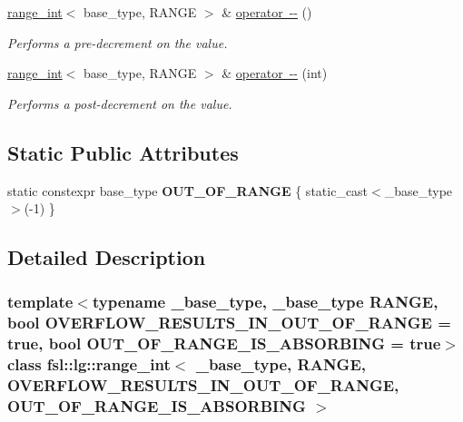 \begin{DoxyCompactItemize}
\mbox{\label{classfsl_1_1lg_1_1range__int_a06da23d144b8af8060cc6797b2fa03a1}} 
\mbox{\hyperlink{classfsl_1_1lg_1_1range__int}{range\+\_\+int}}$<$ base\+\_\+type, R\+A\+N\+GE $>$ \& \mbox{\hyperlink{classfsl_1_1lg_1_1range__int_a06da23d144b8af8060cc6797b2fa03a1}{operator -\/-\/}} ()
\begin{DoxyCompactList}\small\item\em Performs a pre-\/decrement on the value. \end{DoxyCompactList}\item 
\mbox{\label{classfsl_1_1lg_1_1range__int_ae1b50c47435f0b925c9737a3fed4fab8}} 
\mbox{\hyperlink{classfsl_1_1lg_1_1range__int}{range\+\_\+int}}$<$ base\+\_\+type, R\+A\+N\+GE $>$ \& \mbox{\hyperlink{classfsl_1_1lg_1_1range__int_ae1b50c47435f0b925c9737a3fed4fab8}{operator -\/-\/}} (int)
\begin{DoxyCompactList}\small\item\em Performs a post-\/decrement on the value. \end{DoxyCompactList}\end{DoxyCompactItemize}
\subsection*{Static Public Attributes}
\begin{DoxyCompactItemize}
\item 
\mbox{\label{classfsl_1_1lg_1_1range__int_ad2c724f2b6b690d1217d51ef4b712225}} 
static constexpr base\+\_\+type {\bfseries O\+U\+T\+\_\+\+O\+F\+\_\+\+R\+A\+N\+GE} \{ static\+\_\+cast$<$\+\_\+base\+\_\+type$>$(-\/1) \}
\end{DoxyCompactItemize}


\subsection{Detailed Description}
\subsubsection*{template$<$typename \+\_\+base\+\_\+type, \+\_\+base\+\_\+type R\+A\+N\+GE, bool O\+V\+E\+R\+F\+L\+O\+W\+\_\+\+R\+E\+S\+U\+L\+T\+S\+\_\+\+I\+N\+\_\+\+O\+U\+T\+\_\+\+O\+F\+\_\+\+R\+A\+N\+GE = true, bool O\+U\+T\+\_\+\+O\+F\+\_\+\+R\+A\+N\+G\+E\+\_\+\+I\+S\+\_\+\+A\+B\+S\+O\+R\+B\+I\+NG = true$>$\newline
class fsl\+::lg\+::range\+\_\+int$<$ \+\_\+base\+\_\+type, R\+A\+N\+G\+E, O\+V\+E\+R\+F\+L\+O\+W\+\_\+\+R\+E\+S\+U\+L\+T\+S\+\_\+\+I\+N\+\_\+\+O\+U\+T\+\_\+\+O\+F\+\_\+\+R\+A\+N\+G\+E, O\+U\+T\+\_\+\+O\+F\+\_\+\+R\+A\+N\+G\+E\+\_\+\+I\+S\+\_\+\+A\+B\+S\+O\+R\+B\+I\+N\+G $>$}

